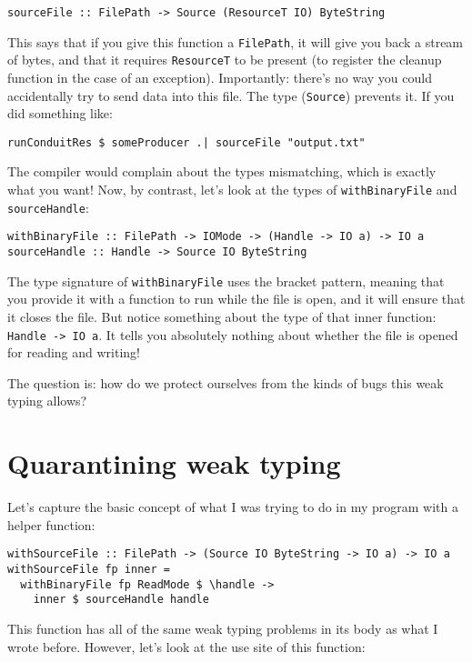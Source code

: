 \begin{verbatim}
sourceFile :: FilePath -> Source (ResourceT IO) ByteString
\end{verbatim}
This says that if you give this function a \texttt{FilePath}, it will give you back a stream of bytes, and that it requires \texttt{ResourceT} to be present (to register the cleanup function in the case of an exception). Importantly: there's no way you could accidentally try to send data into this file. The type (\texttt{Source}) prevents it. If you did something like:

\begin{verbatim}
runConduitRes $ someProducer .| sourceFile "output.txt"
\end{verbatim}
The compiler would complain about the types mismatching, which is exactly what you want! Now, by contrast, let's look at the types of \texttt{withBinaryFile} and \texttt{sourceHandle}:

\begin{verbatim}
withBinaryFile :: FilePath -> IOMode -> (Handle -> IO a) -> IO a
sourceHandle :: Handle -> Source IO ByteString
\end{verbatim}
The type signature of \texttt{withBinaryFile} uses the bracket pattern, meaning that you provide it with a function to run while the file is open, and it will ensure that it closes the file. But notice something about the type of that inner function: \texttt{Handle -> IO a}. It tells you absolutely nothing about whether the file is opened for reading and writing!

The question is: how do we protect ourselves from the kinds of bugs this weak typing allows?

\section{Quarantining weak typing}

Let's capture the basic concept of what I was trying to do in my program with a helper function:

\begin{verbatim}
withSourceFile :: FilePath -> (Source IO ByteString -> IO a) -> IO a
withSourceFile fp inner =
  withBinaryFile fp ReadMode $ \handle ->
    inner $ sourceHandle handle
\end{verbatim}
This function has all of the same weak typing problems in its body as what I wrote before. However, let's look at the use site of this function:


